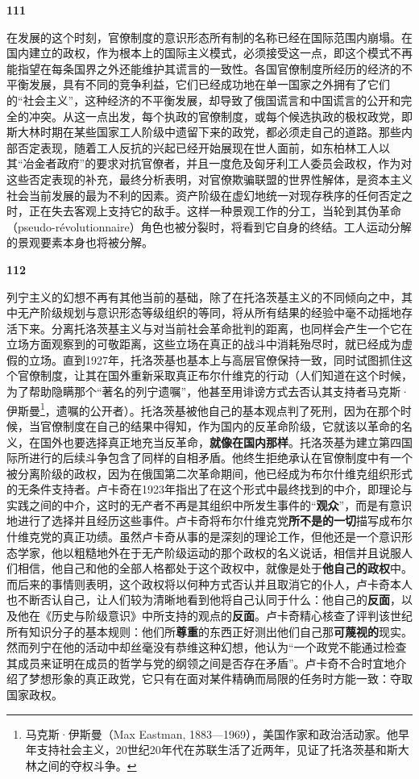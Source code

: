\documentclass[fontset=fandol, a4paper, 12pt, openright]{ctexbook}
\makeatletter
\newcommand{\thesis}[1]{%
    \par\vspace{1.5em}%
    {\centering \textbf{\Large #1}\par}%
    \nobreak\vspace{0.5em}\nobreak
    \@afterindenttrue %
    \@afterheading    %
}
\makeatother
\begin{document}
\thesis{111}
在发展的这个时刻，官僚制度的意识形态所有制的名称已经在国际范围内崩塌。在国内建立的政权，作为根本上的国际主义模式，必须接受这一点，即这个模式不再能指望在每条国界之外还能维护其谎言的一致性。各国官僚制度所经历的经济的不平衡发展，具有不同的竞争利益，它们已经成功地在单一国家之外拥有了它们的“社会主义”，这种经济的不平衡发展，却导致了俄国谎言和中国谎言的公开和完全的冲突。从这一点出发，每个执政的官僚制度，或每个候选执政的极权政党，即斯大林时期在某些国家工人阶级中遗留下来的政党，都必须走自己的道路。那些内部否定表现，随着工人反抗的兴起已经开始展现在世人面前，如东柏林工人以其“冶金者政府”的要求对抗官僚者，并且一度危及匈牙利工人委员会政权，作为对这些否定表现的补充，最终分析表明，对官僚欺骗联盟的世界性解体，是资本主义社会当前发展的最为不利的因素。资产阶级在虚幻地统一对现存秩序的任何否定之时，正在失去客观上支持它的敌手。这样一种景观工作的分工，当轮到其伪革命（pseudo-révolutionnaire）角色也被分裂时，将看到它自身的终结。工人运动分解的景观要素本身也将被分解。

\thesis{112}
列宁主义的幻想不再有其他当前的基础，除了在托洛茨基主义的不同倾向之中，其中无产阶级规划与意识形态等级组织的等同，将从所有结果的经验中毫不动摇地存活下来。分离托洛茨基主义与对当前社会革命批判的距离，也同样会产生一个它在立场方面观察到的可敬距离，这些立场在真正的战斗中消耗殆尽时，就已经成为虚假的立场。直到1927年，托洛茨基也基本上与高层官僚保持一致，同时试图抓住这个官僚制度，让其在国外重新采取真正布尔什维克的行动（人们知道在这个时候，为了帮助隐瞒那个“著名的列宁遗嘱”，他甚至用诽谤方式去否认其支持者马克斯·伊斯曼\footnote{马克斯·伊斯曼（Max Eastman, 1883—1969），美国作家和政治活动家。他早年支持社会主义，20世纪20年代在苏联生活了近两年，见证了托洛茨基和斯大林之间的夺权斗争。}，遗嘱的公开者）。托洛茨基被他自己的基本观点判了死刑，因为在那个时候，当官僚制度在自己的结果中得知，作为国内的反革命阶级，它就该以革命的名义，在国外也要选择真正地充当反革命，\textbf{就像在国内那样}。托洛茨基为建立第四国际所进行的后续斗争包含了同样的自相矛盾。他终生拒绝承认在官僚制度中有一个被分离阶级的政权，因为在俄国第二次革命期间，他已经成为布尔什维克组织形式的无条件支持者。卢卡奇在1923年指出了在这个形式中最终找到的中介，即理论与实践之间的中介，这时的无产者不再是其组织中所发生事件的“\textbf{观众}”，而是有意识地进行了选择并且经历这些事件。卢卡奇将布尔什维克党\textbf{所不是的一切}描写成布尔什维克党的真正功绩。虽然卢卡奇从事的是深刻的理论工作，但他还是一个意识形态学家，他以粗糙地外在于无产阶级运动的那个政权的名义说话，相信并且说服人们相信，他自己和他的全部人格都处于这个政权中，就像是处于\textbf{他自己的政权}中。而后来的事情则表明，这个政权将以何种方式否认并且取消它的仆人，卢卡奇本人也不断否认自己，让人们较为清晰地看到他将自己认同于什么：他自己的\textbf{反面}，以及他在《历史与阶级意识》中所支持的观点的\textbf{反面}。卢卡奇精心核查了评判该世纪所有知识分子的基本规则：他们所\textbf{尊重}的东西正好测出他们自己那\textbf{可蔑视的}现实。然而列宁在他的活动中却丝毫没有恭维这种幻想，他认为“一个政党不能通过检查其成员来证明在成员的哲学与党的纲领之间是否存在矛盾”。卢卡奇不合时宜地介绍了梦想形象的真正政党，它只有在面对某件精确而局限的任务时方能一致：夺取国家政权。
\end{document}
